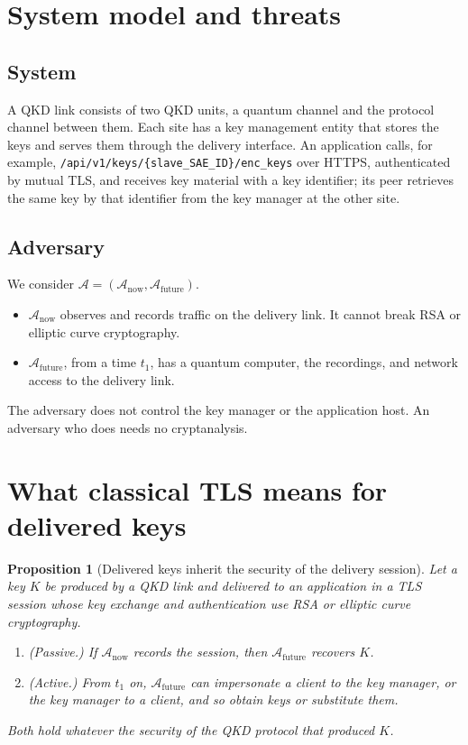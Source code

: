 \documentclass[11pt,letterpaper]{article}
\newtheorem{proposition}[theorem]{Proposition}
\begin{document}
\section{System model and threats}

\subsection{System}

A QKD link consists of two QKD units, a quantum channel and the protocol channel between them. Each site has a key management entity that stores the keys and serves them through the delivery interface. An application calls, for example, \texttt{/api/v1/keys/\{slave\_SAE\_ID\}/enc\_keys} over HTTPS, authenticated by mutual TLS, and receives key material with a key identifier; its peer retrieves the same key by that identifier from the key manager at the other site.

\subsection{Adversary}

We consider $\mathcal{A} = (\mathcal{A}_{\text{now}}, \mathcal{A}_{\text{future}})$.

\begin{itemize}
    \item $\mathcal{A}_{\text{now}}$ observes and records traffic on the delivery link. It cannot break RSA or elliptic curve cryptography.
    \item $\mathcal{A}_{\text{future}}$, from a time $t_1$, has a quantum computer, the recordings, and network access to the delivery link.
\end{itemize}

The adversary does not control the key manager or the application host. An adversary who does needs no cryptanalysis.

\section{What classical TLS means for delivered keys}

\begin{proposition}[Delivered keys inherit the security of the delivery session]
\label{thm:main}
Let a key $K$ be produced by a QKD link and delivered to an application in a TLS session whose key exchange and authentication use RSA or elliptic curve cryptography.
\begin{enumerate}
    \item (Passive.) If $\mathcal{A}_{\text{now}}$ records the session, then $\mathcal{A}_{\text{future}}$ recovers $K$.
    \item (Active.) From $t_1$ on, $\mathcal{A}_{\text{future}}$ can impersonate a client to the key manager, or the key manager to a client, and so obtain keys or substitute them.
\end{enumerate}
Both hold whatever the security of the QKD protocol that produced $K$.
\end{proposition}
\end{document}
